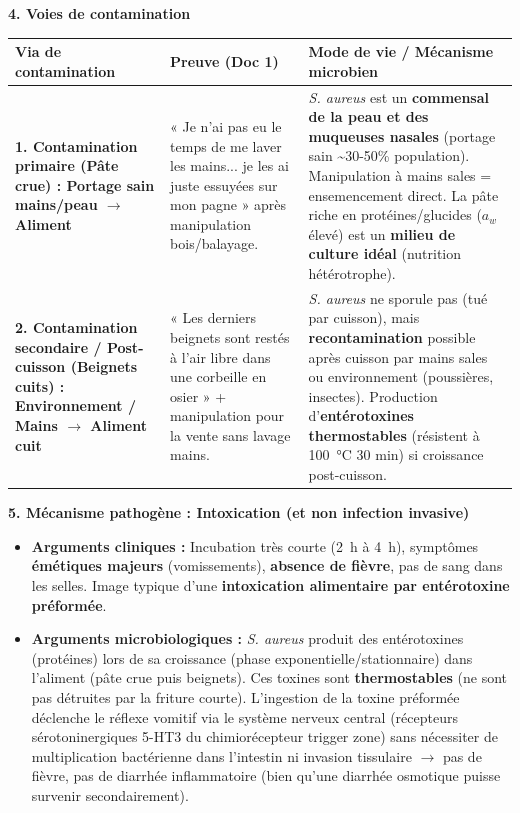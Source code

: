 \documentclass[11pt]{article}
\newcommand{\cle}[1]{{\popxbold\color{popdark}#1}}
\begin{document}
\begin{exoresolu}
\textbf{4. Voies de contamination}
\begin{center}
\begin{tabularx}{\linewidth}{|l|X|X|}\hline
\rowcolor{popblueL}
\textbf{Via de contamination} & \textbf{Preuve (Doc 1)} & \textbf{Mode de vie / Mécanisme microbien} \\ \hline
\textbf{1. Contamination primaire (Pâte crue) : Portage sain mains/peau $\rightarrow$ Aliment} & « Je n'ai pas eu le temps de me laver les mains... je les ai juste essuyées sur mon pagne » après manipulation bois/balayage. & \textit{S. aureus} est un \textbf{commensal de la peau et des muqueuses nasales} (portage sain \textasciitilde 30-50\% population). Manipulation à mains sales = ensemencement direct. La pâte riche en protéines/glucides ($a_w$ élevé) est un \textbf{milieu de culture idéal} (nutrition hétérotrophe). \\ \hline
\textbf{2. Contamination secondaire / Post-cuisson (Beignets cuits) : Environnement / Mains $\rightarrow$ Aliment cuit} & « Les derniers beignets sont restés à l'air libre dans une corbeille en osier » + manipulation pour la vente sans lavage mains. & \textit{S. aureus} ne sporule pas (tué par cuisson), mais \textbf{recontamination} possible après cuisson par mains sales ou environnement (poussières, insectes). Production d'\textbf{entérotoxines thermostables} (résistent à \SI{100}{\celsius} 30 min) si croissance post-cuisson. \\ \hline
\end{tabularx}
\end{center}

\textbf{5. Mécanisme pathogène : Intoxication (et non infection invasive)}
\begin{itemize}
    \item \textbf{Arguments cliniques :} Incubation très courte (\SI{2}{\hour} à \SI{4}{\hour}), symptômes \textbf{émétiques majeurs} (vomissements), \textbf{absence de fièvre}, pas de sang dans les selles. Image typique d'une \textbf{intoxication alimentaire par entérotoxine préformée}.
    \item \textbf{Arguments microbiologiques :} \textit{S. aureus} produit des \cle{entérotoxines} (protéines) lors de sa croissance (phase exponentielle/stationnaire) dans l'aliment (pâte crue puis beignets). Ces toxines sont \textbf{thermostables} (ne sont pas détruites par la friture courte). L'ingestion de la toxine préformée déclenche le réflexe vomitif via le système nerveux central (récepteurs sérotoninergiques 5-HT3 du chimiorécepteur trigger zone) sans nécessiter de multiplication bactérienne dans l'intestin ni invasion tissulaire $\rightarrow$ pas de fièvre, pas de diarrhée inflammatoire (bien qu'une diarrhée osmotique puisse survenir secondairement).
\end{itemize}


\end{exoresolu}
\end{document}

